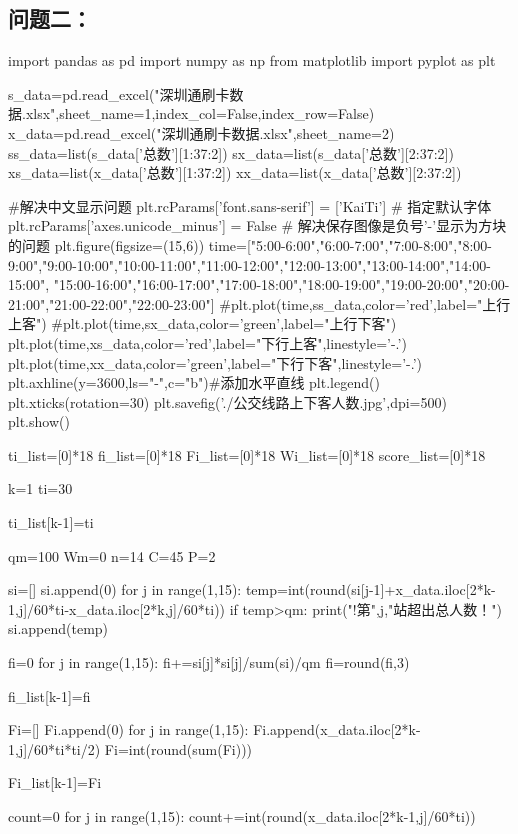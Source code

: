 \documentclass[UTF8]{ctexart}
\begin{document}
	\subsection{问题二：}
	\begin{python}
		import pandas as pd
		import numpy as np
		from matplotlib import pyplot as plt
		
		s_data=pd.read_excel("深圳通刷卡数据.xlsx",sheet_name=1,index_col=False,index_row=False)  
		x_data=pd.read_excel("深圳通刷卡数据.xlsx",sheet_name=2)    
		ss_data=list(s_data['总数'][1:37:2])
		sx_data=list(s_data['总数'][2:37:2])
		xs_data=list(x_data['总数'][1:37:2])
		xx_data=list(x_data['总数'][2:37:2])
		
		#解决中文显示问题
		plt.rcParams['font.sans-serif'] = ['KaiTi'] # 指定默认字体
		plt.rcParams['axes.unicode_minus'] = False # 解决保存图像是负号'-'显示为方块的问题
		plt.figure(figsize=(15,6))
		time=["5:00-6:00","6:00-7:00","7:00-8:00","8:00-9:00","9:00-10:00","10:00-11:00","11:00-12:00","12:00-13:00","13:00-14:00","14:00-15:00",
		"15:00-16:00","16:00-17:00","17:00-18:00","18:00-19:00","19:00-20:00","20:00-21:00","21:00-22:00","22:00-23:00"]
		#plt.plot(time,ss_data,color='red',label="上行上客")
		#plt.plot(time,sx_data,color='green',label="上行下客")
		plt.plot(time,xs_data,color='red',label="下行上客",linestyle='-.')
		plt.plot(time,xx_data,color='green',label="下行下客",linestyle='-.')
		plt.axhline(y=3600,ls="-",c="b")#添加水平直线
		plt.legend()
		plt.xticks(rotation=30)
		plt.savefig('./公交线路上下客人数.jpg',dpi=500)
		plt.show()
		
		ti_list=[0]*18
		fi_list=[0]*18
		Fi_list=[0]*18
		Wi_list=[0]*18
		score_list=[0]*18
		
		k=1
		ti=30
		
		ti_list[k-1]=ti
		
		qm=100
		Wm=0
		n=14
		C=45
		P=2
		
		si=[]
		si.append(0)
		for j in range(1,15):
		temp=int(round(si[j-1]+x_data.iloc[2*k-1,j]/60*ti-x_data.iloc[2*k,j]/60*ti))
		if temp>qm:
		print("!第",j,"站超出总人数！")
		si.append(temp)
		
		fi=0
		for j in range(1,15):
		fi+=si[j]*si[j]/sum(si)/qm
		fi=round(fi,3)
		
		fi_list[k-1]=fi
		
		Fi=[]
		Fi.append(0)
		for j in range(1,15):
		Fi.append(x_data.iloc[2*k-1,j]/60*ti*ti/2)
		Fi=int(round(sum(Fi)))
		
		Fi_list[k-1]=Fi
		
		count=0
		for j in range(1,15):
		count+=int(round(x_data.iloc[2*k-1,j]/60*ti))
		

\end{python}
\end{document}
